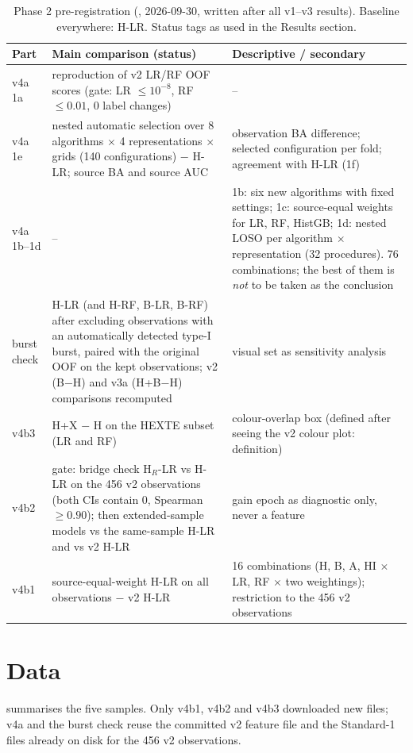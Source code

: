 \begin{table}[htbp]
\centering\small
\caption[Phase 2 pre-registration]{Phase 2 pre-registration (, 2026-09-30, written after all v1--v3
results). Baseline everywhere: H-LR. Status tags as used in the Results section.}
\label{tab:p2prereg}
\begin{tabularx}{\textwidth}{@{}p{1.7cm}p{3.6cm}X@{}}
\toprule
Part & Main comparison (status) & Descriptive / secondary \\
\midrule
v4a 1a & reproduction of v2 LR/RF OOF scores (gate: LR $\le10^{-8}$, RF $\le0.01$, 0 label changes) & -- \\
v4a 1e & \Primary{} nested automatic selection over 8 algorithms $\times$ 4 representations $\times$ grids (140 configurations) $-$ H-LR; source BA and source AUC & observation BA difference; selected configuration per fold; agreement with H-LR (1f) \\
v4a 1b--1d & -- & \Descriptive{} 1b: six new algorithms with fixed settings; 1c: source-equal weights for LR, RF, HistGB; 1d: nested LOSO per algorithm $\times$ representation (32 procedures). 76 combinations; the best of them is \emph{not} to be taken as the conclusion \\
burst check & \Secondary{} H-LR (and H-RF, B-LR, B-RF) after excluding observations with an automatically detected type-I burst, paired with the original OOF on the kept observations; v2 (B$-$H) and v3a (H+B$-$H) comparisons recomputed & visual set as sensitivity analysis \\
v4b3 & \Secondary{} H+X $-$ H on the HEXTE subset (LR and RF) & colour-overlap box (defined after seeing the v2 colour plot: \PostHoc{} definition) \\
v4b2 & gate: bridge check H$_R$-LR vs H-LR on the 456 v2 observations (both CIs contain 0, Spearman $\ge0.90$); then \Secondary{} extended-sample models vs the same-sample H-LR and vs v2 H-LR & gain epoch as diagnostic only, never a feature \\
v4b1 & \Secondary{} source-equal-weight H-LR on all observations $-$ v2 H-LR & 16 combinations (H, B, A, HI $\times$ LR, RF $\times$ two weightings); restriction to the 456 v2 observations \\
\bottomrule
\end{tabularx}
\end{table}

\section{Data}
 summarises the five samples. Only v4b1, v4b2 and v4b3 downloaded new files; v4a and the burst
check reuse the committed v2 feature file and the Standard-1 files already on disk for the 456 v2 observations.


